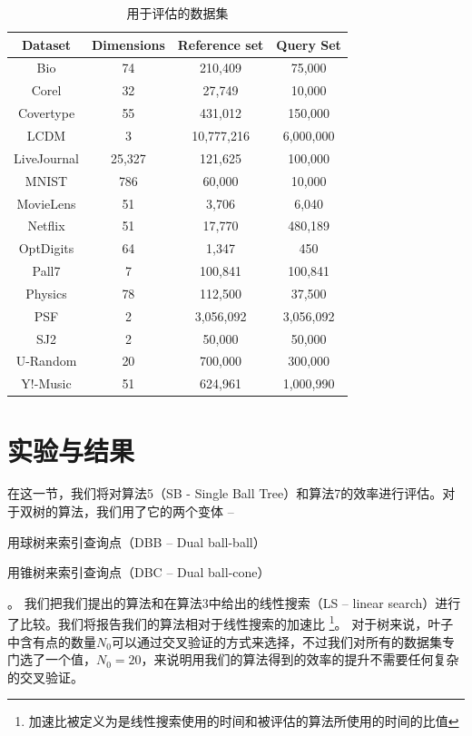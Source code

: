\documentclass[twocolumn]{article}
\begin{document}
\begin{table}[]
\centering
\begin{tabular}{|c|c|c|c|}
\hline
Dataset     & Dimensions & Reference set & Query Set \\
\hline
Bio         & 74         & 210,409       & 75,000    \\
\hline
Corel       & 32         & 27,749        & 10,000    \\
\hline
Covertype   & 55         & 431,012       & 150,000   \\
\hline
LCDM        & 3          & 10,777,216    & 6,000,000 \\
\hline
LiveJournal & 25,327     & 121,625       & 100,000   \\
\hline
MNIST       & 786        & 60,000        & 10,000    \\
\hline
MovieLens   & 51         & 3,706         & 6,040     \\
\hline
Netflix     & 51         & 17,770        & 480,189   \\
\hline
OptDigits   & 64         & 1,347         & 450       \\
\hline
Pall7       & 7          & 100,841       & 100,841   \\
\hline
Physics     & 78         & 112,500       & 37,500    \\
\hline
PSF         & 2          & 3,056,092     & 3,056,092 \\
\hline
SJ2         & 2          & 50,000        & 50,000    \\
\hline
U-Random    & 20         & 700,000       & 300,000   \\
\hline
Y!-Music    & 51         & 624,961       & 1,000,990 \\
\hline
\end{tabular}
\caption{用于评估的数据集}
\label{table1}
\end{table}

\section{实验与结果}
在这一节，我们将对算法5（SB - Single Ball Tree）和算法7的效率进行评估。对于双树的算法，我们用了它的两个变体 --
\begin{enumerate*}[label={\roman*}]
\item 用球树来索引查询点（DBB -- Dual ball-ball）
\item 用锥树来索引查询点（DBC -- Dual ball-cone）
\end{enumerate*}。
我们把我们提出的算法和在算法3中给出的线性搜索（LS -- linear search）进行了比较。我们将报告我们的算法相对于线性搜索的加速比
\footnote{加速比被定义为是线性搜索使用的时间和被评估的算法所使用的时间的比值}。
对于树来说，叶子中含有点的数量$N_0$可以通过交叉验证的方式来选择，不过我们对所有的数据集专门选了一个值，$N_0 = 20$，来说明用我们的算法得到的效率的提升不需要任何复杂的交叉验证。
\end{document}
